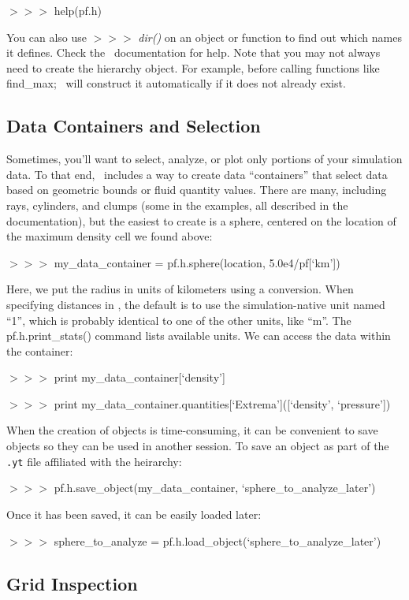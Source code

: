 {\scriptsize$>>>$} help(pf.h)

You can also use {\scriptsize$>>>$} {\it dir()} on an object or
function to find out which names it defines. Check the 
\yt\ documentation for help. Note that you may not always need to create
the hierarchy object.  For example, before calling
functions like find\_max; \yt\ will construct it automatically if it
does not already exist.

\subsection{Data Containers and Selection}

Sometimes, you'll want to select, analyze, or plot only portions of
your simulation data. To that end, \yt\ includes a way to create data
``containers'' that select data based on geometric bounds or fluid
quantity values. There are many, including rays, cylinders, and clumps
(some in the examples, all described in the documentation), but the
easiest to create is a sphere, centered on the location of the maximum
density cell we found above:

{\scriptsize$>>>$} my\_data\_container = pf.h.sphere(location, 5.0e4/pf[`km'])

Here, we put the radius in units of kilometers using a
conversion. When specifying distances in \yt, the default is to use the
simulation-native unit named ``1'', which is probably identical to one
of the other units, like ``m''. The pf.h.print\_stats() command lists
available units. We can access the data within the container:

{\scriptsize$>>>$} print my\_data\_container[`density']

{\scriptsize$>>>$} print my\_data\_container.quantities[`Extrema']([`density', `pressure'])

When the creation of objects is time-consuming, it can be convenient
to save objects so they can be used in another session. To save an
object as part of the {\tt .yt} file affiliated with the heirarchy:

{\scriptsize$>>>$} pf.h.save\_object(my\_data\_container, `sphere\_to\_analyze\_later')

Once it has been saved, it can be easily loaded later:

{\scriptsize$>>>$} sphere\_to\_analyze = pf.h.load\_object(`sphere\_to\_analyze\_later')

\subsection{Grid Inspection}

